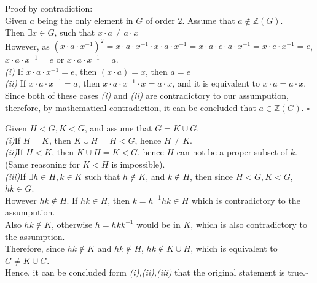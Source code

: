 \documentclass[11pt]{article}
\newenvironment{problem}[2][Problem]{\begin{trivlist}
\item[\hskip \labelsep {\bfseries #1}\hskip \labelsep {\bfseries #2.}]}{\end{trivlist}}
\begin{document}
\begin{problem}{3} Proof by contradiction:\\
Given $a$ being the only element in $G$ of order $2$. Assume that $a \notin \mathbb{Z}(G)$.\\
Then $\exists x \in G$, such that $x\cdot a \neq a \cdot x$\\
However, as $(x\cdot a \cdot x^{-1})^2 = x \cdot a \cdot x^{-1} \cdot x \cdot a \cdot x^{-1} = x\cdot a \cdot e \cdot a \cdot x^{-1} = x \cdot e \cdot x^{-1} = e$,\\
$x\cdot a \cdot x^{-1} = e$ or $x\cdot a \cdot x^{-1} = a$.\\
\textit{(i)} If $x \cdot a \cdot x^{-1}=e$, then $(x\cdot a) =x $, then $a = e$\\
\textit{(ii)} If $x \cdot a \cdot x^{-1}=a$, then $ x \cdot a \cdot x^{-1} \cdot x = a \cdot x$, and it is equivalent to $x\cdot a = a \cdot x$.\\
Since both of these cases \textit{(i)} and \textit{(ii)} are contradictory to our assumpution, therefore, by mathematical contradiction, it can be concluded that $a \in \mathbb{Z}(G)$. $\square$\\
\end{problem}
\newpage

\begin{problem}{4}
Given $H<G, K<G$, and assume that $G = K \cup G$.\\
\textit{(i)}If $H = K$, then $K \cup H  = H < G$, hence $H \neq K$.\\
\textit{(ii)}If $H<K$, then $K \cup H = K <G$, hence $H$ can not be a proper subset of $k$. (Same reasoning for $K<H$ is impossible).\\
\textit{(iii)}If $\exists h \in H, k\in K$ such that $h\notin K$, and $k \notin H$, then since $H<G, K<G$, $hk \in G$.\\
However $hk \notin H$. If $hk \in H$, then $k = h^{-1} hk \in H$ which is contradictory to the assumpution.\\
Also $hk \notin K$, otherwise $h = hkk^{-1}$ would be in $K$, which is also contradictory to the assumption.\\
Therefore, since $hk \notin K$ and $hk \notin H$, $hk \notin K\cup H$, which is equivalent to $G \neq K\cup G$.\\
Hence, it can be concluded form \textit{(i),(ii),(iii)} that the original statement is true.$\square$\\

\end{problem}
\end{document}
